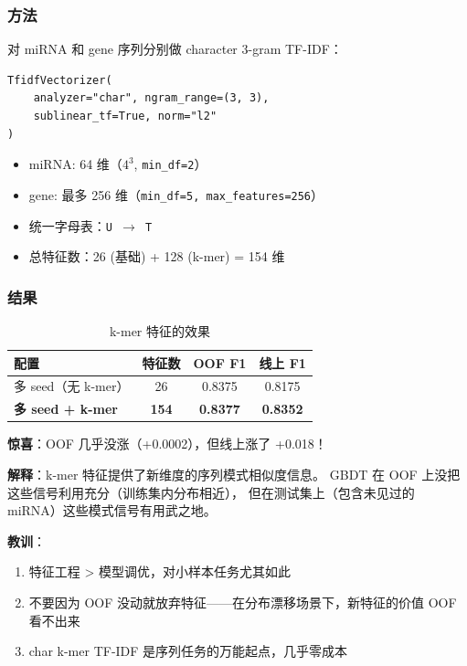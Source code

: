 \documentclass[11pt,a4paper]{article}
\begin{document}
\subsubsection{方法}

对 miRNA 和 gene 序列分别做 character 3-gram TF-IDF：

\begin{lstlisting}
TfidfVectorizer(
    analyzer="char", ngram_range=(3, 3),
    sublinear_tf=True, norm="l2"
)
\end{lstlisting}

\begin{itemize}[nosep]
    \item miRNA: 64 维（$4^3$, \texttt{min\_df=2}）
    \item gene: 最多 256 维（\texttt{min\_df=5, max\_features=256}）
    \item 统一字母表：\texttt{U $\to$ T}
    \item 总特征数：26 (基础) + 128 (k-mer) = 154 维
\end{itemize}

\subsubsection{结果}

\begin{table}[H]
\centering
\caption{k-mer 特征的效果}
\begin{tabular}{lccc}
\toprule
配置 & 特征数 & OOF F1 & 线上 F1 \\
\midrule
多 seed（无 k-mer） & 26 & 0.8375 & 0.8175 \\
\textbf{多 seed + k-mer} & \textbf{154} & \textbf{0.8377} & \textbf{0.8352} \\
\bottomrule
\end{tabular}
\end{table}

\textbf{惊喜}：OOF 几乎没涨（+0.0002），但线上涨了 +0.018！

\textbf{解释}：k-mer 特征提供了新维度的序列模式相似度信息。
GBDT 在 OOF 上没把这些信号利用充分（训练集内分布相近），
但在测试集上（包含未见过的 miRNA）这些模式信号有用武之地。

\textbf{教训}：
\begin{enumerate}[nosep]
    \item 特征工程 > 模型调优，对小样本任务尤其如此
    \item 不要因为 OOF 没动就放弃特征——在分布漂移场景下，新特征的价值 OOF 看不出来
    \item char k-mer TF-IDF 是序列任务的万能起点，几乎零成本
\end{enumerate}
\end{document}
